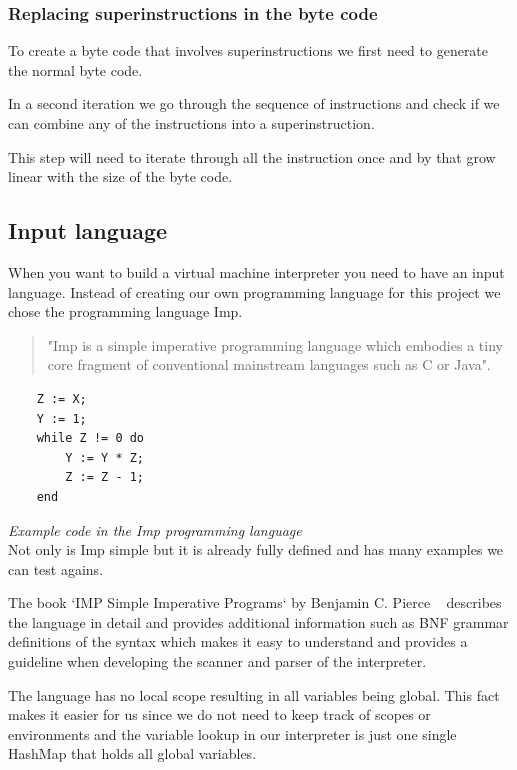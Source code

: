 \documentclass{article}
\begin{document}
\subsubsection{Replacing superinstructions in the byte code}
\label{sec:replacing_superinstructions}
To create a byte code that involves superinstructions we first need to generate
the normal byte code.

In a second iteration we go through the sequence of instructions and check
if we can combine any of the instructions into a superinstruction.

This step will need to iterate through all the instruction once and by that
grow linear with the size of the byte code.

\subsection{Input language} %
\label{sec:input_language}
When you want to build a virtual machine interpreter you need to have an
input language. Instead of creating our own programming language for this
project we chose the programming language Imp. ~\cite{Pierce:SF1}

\begin{quotation}
"Imp is a simple imperative programming language which embodies a tiny core
fragment of conventional mainstream languages such as C or Java". ~\cite{Pierce:SF1}
\end{quotation}

\begin{verbatim}
    Z := X;
    Y := 1;
    while Z != 0 do
        Y := Y * Z;
        Z := Z - 1;
    end
\end{verbatim}
\textit{Example code in the Imp programming language} \\

Not only is Imp simple but it is already fully defined and has many examples
we can test agains.

The book `IMP Simple Imperative Programs` by Benjamin C. Pierce
~\cite{Pierce:SF1} describes the language in detail and provides additional
information such as BNF grammar definitions of the syntax which makes it easy
to understand and provides a guideline when developing the scanner and parser
of the interpreter.

The language has no local scope resulting in all variables being global. This
fact makes it easier for us since we do not need to keep track of scopes or
environments and the variable lookup in our interpreter is just one single
HashMap that holds all global variables.
\end{document}
